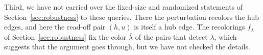Third, we have not carried over the fixed-size and randomized statements
of Section~\ref{sec:robustness} to these queries. There the perturbation
recolors the hub edges, and here the read-off pair $(h,u)$ is itself a
hub edge. The recolorings $f_\lambda$ of Section~\ref{sec:robustness} fix
the color $\bar\lambda$ of the pairs that detect $\lambda$, which suggests
that the argument goes through, but we have not checked the details.
